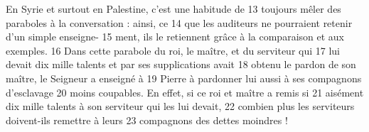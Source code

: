 En Syrie et surtout en Palestine, c'est une habitude de	 
13	 	toujours mêler des paraboles à la conversation : ainsi, ce	 
14	 	que les auditeurs ne pourraient retenir d'un simple enseigne-	 
15	 	ment, ils le retiennent grâce à la comparaison et aux exemples.	 
16	 	Dans cette parabole du roi, le maître, et du serviteur qui	 
17	 	lui devait dix mille talents et par ses supplications avait	 
18	 	obtenu le pardon de son maître, le Seigneur a enseigné à	 
19	 	Pierre à pardonner lui aussi à ses compagnons d'esclavage	 
20	 	moins coupables. En effet, si ce roi et maître a remis si	 
21	 	aisément dix mille talents à son serviteur qui les lui devait,	 
22	 	combien plus les serviteurs doivent-ils remettre à leurs	 
23	 	compagnons des dettes moindres !